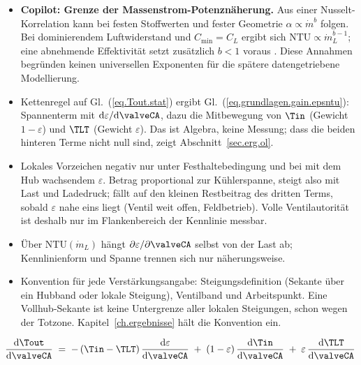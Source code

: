 \begin{itemize}
  \item \textbf{Copilot: Grenze der Massenstrom-Potenznäherung.}
    Aus einer Nusselt-Korrelation kann bei festen Stoffwerten und
    fester Geometrie $\alpha\propto\dot m^b$ folgen.
    Bei dominierendem Luftwiderstand und $C_{\min}=C_L$ ergibt sich
    $\mathrm{NTU}\propto\dot m_L^{b-1}$; eine abnehmende
    Effektivität setzt zusätzlich $b<1$ voraus
    \cite[S.~826--827 und 839]{almbauerThermomanagement2019}.
    Diese Annahmen begründen keinen universellen Exponenten für die
    spätere datengetriebene Modellierung.
\end{itemize}

\begin{itemize}
  \item Kettenregel auf Gl.~(\ref{eq.Tout.stat}) ergibt
    Gl.~(\ref{eq.grundlagen.gain.epsntu}): Spannenterm mit
    $\mathrm{d}\varepsilon/\mathrm{d}\valveCA$, dazu die Mitbewegung von $\Tin$
    (Gewicht $1-\varepsilon$) und $\TLT$ (Gewicht $\varepsilon$). Das ist
    Algebra, keine Messung; dass die beiden hinteren Terme nicht null sind,
    zeigt Abschnitt~\ref{sec.erg.ol}.
  \item Lokales Vorzeichen negativ nur unter Festhaltebedingung und bei mit dem
    Hub wachsendem $\varepsilon$. Betrag proportional zur Kühlerspanne, steigt
    also mit Last und Ladedruck; fällt auf den kleinen Restbeitrag des dritten
    Terms, sobald $\varepsilon$ nahe eins liegt (Ventil weit offen, Feldbetrieb).
    Volle Ventilautorität ist deshalb nur im Flankenbereich der Kennlinie
    messbar.
  \item Über $\mathrm{NTU}(\dot m_L)$ hängt $\partial\varepsilon/\partial\valveCA$
    selbst von der Last ab; Kennlinienform und Spanne trennen sich nur
    näherungsweise.
  \item Konvention für jede Verstärkungsangabe: Steigungsdefinition (Sekante über
    ein Hubband oder lokale Steigung), Ventilband und Arbeitspunkt. Eine
    Vollhub-Sekante ist keine Untergrenze aller lokalen Steigungen, schon wegen
    der Totzone. Kapitel~\ref{ch.ergebnisse} hält die Konvention ein.
\end{itemize}

\begin{equation}
  \label{eq.grundlagen.gain.epsntu}
  \frac{\mathrm{d}\Tout}{\mathrm{d}\valveCA}
  \;=\; -\,(\Tin - \TLT)\,\frac{\mathrm{d}\varepsilon}{\mathrm{d}\valveCA}
  \;+\; (1-\varepsilon)\,\frac{\mathrm{d}\Tin}{\mathrm{d}\valveCA}
  \;+\; \varepsilon\,\frac{\mathrm{d}\TLT}{\mathrm{d}\valveCA}
\end{equation}

